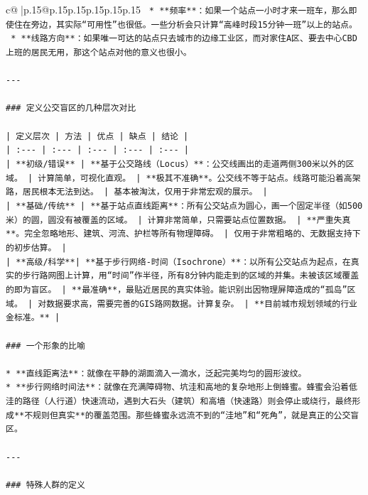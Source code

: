 \documentclass{article}
\begin{document}
{\begin{supertabular}{c@{$\;$}|p{.15\linewidth}@{}p{.15\linewidth}p{.15\linewidth}p{.15\linewidth}p{.15\linewidth}p{.15\linewidth}}
{{{\texttt{    *   **频率**：如果一个站点一小时才来一班车，那么即使住在旁边，其实际“可用性”也很低。一些分析会只计算“高峰时段15分钟一班”以上的站点。} \\
\texttt{    *   **线路方向**：如果唯一可达的站点只去城市的边缘工业区，而对家住A区、要去中心CBD上班的居民无用，那这个站点对他的意义也很小。} \\
\\ 
\texttt{{-}{-}{-}} \\
\\ 
\texttt{\#\#\# 定义公交盲区的几种层次对比} \\
\\ 
\texttt{| 定义层次 | 方法 | 优点 | 缺点 | 结论 |} \\
\texttt{| :{-}{-}{-} | :{-}{-}{-} | :{-}{-}{-} | :{-}{-}{-} | :{-}{-}{-} |} \\
\texttt{| **初级/错误** | **基于公交路线（Locus）**：公交线画出的走道两侧300米以外的区域。 | 计算简单，可视化直观。 | **极其不准确**。公交线不等于站点。线路可能沿着高架路，居民根本无法到达。 | 基本被淘汰，仅用于非常宏观的展示。 |} \\
\texttt{| **基础/传统** | **基于站点直线距离**：所有公交站点为圆心，画一个固定半径（如500米）的圆，圆没有被覆盖的区域。 | 计算非常简单，只需要站点位置数据。 | **严重失真**。完全忽略地形、建筑、河流、护栏等所有物理障碍。 | 仅用于非常粗略的、无数据支持下的初步估算。 |} \\
\texttt{| **高级/科学**| **基于步行网络{-}时间（Isochrone）**：以所有公交站点为起点，在真实的步行路网图上计算，用“时间”作半径，所有8分钟内能走到的区域的并集。未被该区域覆盖的即为盲区。 | **最准确**，最贴近居民的真实体验。能识别出因物理屏障造成的“孤岛”区域。 | 对数据要求高，需要完善的GIS路网数据。计算复杂。 | **目前城市规划领域的行业金标准。** |} \\
\\ 
\texttt{\#\#\# 一个形象的比喻} \\
\\ 
\texttt{*   **直线距离法**：就像在平静的湖面滴入一滴水，泛起完美均匀的圆形波纹。} \\
\texttt{*   **步行网络时间法**：就像在充满障碍物、坑洼和高地的复杂地形上倒蜂蜜。蜂蜜会沿着低洼的路径（人行道）快速流动，遇到大石头（建筑）和高墙（快速路）则会停止或绕行，最终形成**不规则但真实**的覆盖范围。那些蜂蜜永远流不到的“洼地”和“死角”，就是真正的公交盲区。} \\
\\ 
\texttt{{-}{-}{-}} \\
\\ 
\texttt{\#\#\# 特殊人群的定义} \\
}}}
\end{supertabular}}
\end{document}
